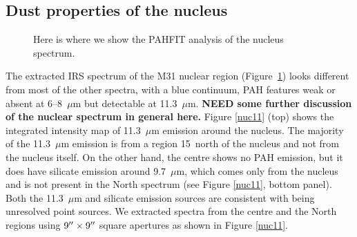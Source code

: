 \subsection{Dust properties of the nucleus}
\label{sect:nucleus}

\begin{figure}
\centering
\caption{Here is where we show the PAHFIT analysis of the nucleus spectrum.}
\label{fig:nuc_pahfit}
\end{figure}


The extracted IRS spectrum of the M31 nuclear region (Figure~\ref{fig:nuc_pahfit})
looks different from most of the other spectra, with
a blue continuum, PAH features weak or absent at 6--8~$\mu$m  but detectable at 11.3~$\mu$m.
{\bf NEED some further discussion of the nuclear spectrum in general here.}
Figure \ref{nuc11} (top) shows the integrated intensity map of 11.3~$\mu$m emission around the nucleus. The majority of the 11.3~$\mu$m 
emission is from a region 15\arcsec\ north of the nucleus and not from the nucleus itself. 
On the other hand, the centre shows no PAH emission,  but it does have silicate emission around 9.7~$\mu$m, 
which comes only from the nucleus and is not present in the North spectrum 
(see Figure \ref{nuc11}, bottom panel).
Both the 11.3~$\mu$m  and silicate emission sources are consistent with being unresolved point sources.
We extracted spectra from the centre and the North regions using  $9\hbox{$^{\prime\prime}$} \times 9\hbox{$^{\prime\prime}$}$ 
square apertures as shown in Figure \ref{nuc11}. 

